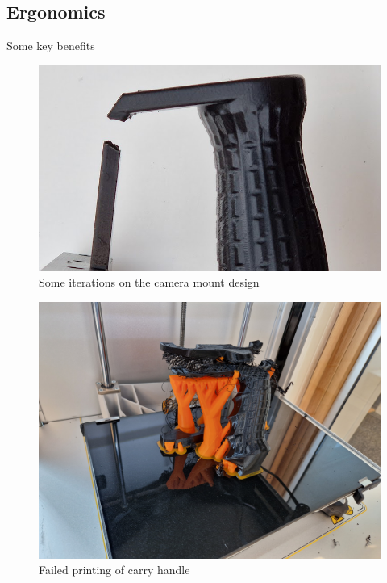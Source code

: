 \subsection{Ergonomics}
Some key benefits

\begin{figure}[H]
    \centering
    \includegraphics[width=\textwidth]{figures/3d_print/break.png}
    \caption{Some iterations on the camera mount design}
    \label{fig:handle_break}
\end{figure}

\begin{figure}[H]
    \centering
    \includegraphics[width=\textwidth]{figures/3d_print/failed.jpg}
    \caption{Failed printing of carry handle}
    \label{fig:handle_fail}
\end{figure}

